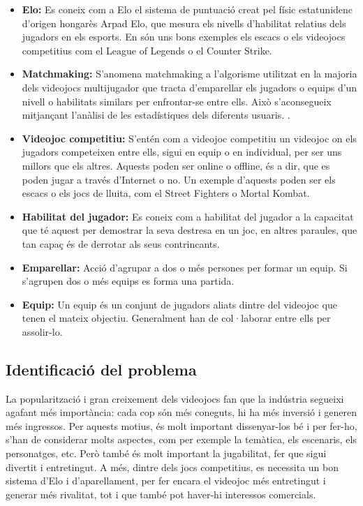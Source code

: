 \documentclass[a4paper]{article}
\begin{document}
\begin{itemize}
\item \textbf{Elo:} Es coneix com a Elo el sistema de puntuació creat pel físic estatunidenc d'origen hongarès Arpad Elo, que mesura els nivells d'habilitat relatius dels jugadors en els esports. En són uns bons exemples els escacs o els videojocs competitius com el League of Legends o el Counter Strike. \cite{wikipediaElo}

\item \textbf{Matchmaking:} S'anomena matchmaking a l'algorisme utilitzat en la majoria dels videojocs multijugador que tracta d'emparellar els jugadors o equips d'un nivell o habilitats similars per enfrontar-se entre ells. Això s'aconsegueix mitjançant l'anàlisi de les estadístiques dels diferents usuaris. \cite{matchmakingDef}.

\item \textbf{Videojoc competitiu:} S'entén com a videojoc competitiu un videojoc on els jugadors competeixen entre ells, sigui en equip o en individual, per ser uns millors que els altres. Aquests poden ser online o offline, és a dir, que es poden jugar a través d'Internet o no. Un exemple d'aquests poden ser els escacs o els jocs de lluita, com el Street Fighters o Mortal Kombat.

\item \textbf{Habilitat del jugador:} Es coneix com a habilitat del jugador a la capacitat que té aquest per demostrar la seva destresa en un joc, en altres paraules, que tan capaç és de derrotar als seus contrincants.

\item \textbf{Emparellar:} Acció d'agrupar a dos o més persones per formar un equip. Si s'agrupen dos o més equips es forma una partida.

\item \textbf{Equip:} Un equip és un conjunt de jugadors aliats dintre del videojoc que tenen el mateix objectiu. Generalment han de col·laborar entre ells per assolir-lo.
\end{itemize}

\newpage
\subsection{Identificació del problema}
La popularització i gran creixement dels videojocs fan que la indústria segueixi agafant més importància: cada cop són més coneguts, hi ha més inversió i generen més ingressos. Per aquests motius, és molt important dissenyar-los bé i per fer-ho, s'han de considerar molts aspectes, com per exemple la temàtica, els escenaris, els personatges, etc. Però també és molt important la jugabilitat, fer que sigui divertit i entretingut. A més, dintre dels jocs competitius, es necessita un bon sistema d'Elo i d'aparellament, per fer encara el videojoc més entretingut i generar més rivalitat, tot i que també pot haver-hi interessos comercials.
\end{document}
